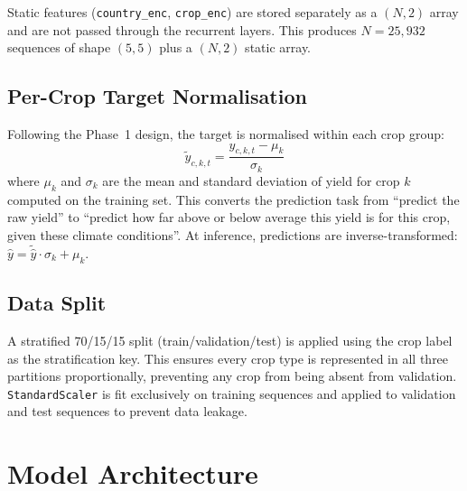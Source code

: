 \documentclass[conference]{IEEEtran}
\begin{document}
Static features (\texttt{country\_enc}, \texttt{crop\_enc}) are stored separately
as a $(N, 2)$ array and are not passed through the recurrent layers.
This produces $N = 25{,}932$ sequences of shape $(5, 5)$ plus a $(N, 2)$ static array.

\subsection{Per-Crop Target Normalisation}
\label{sec:normalisation}

Following the Phase~1 design, the target is normalised within each crop group:
\begin{equation}
    \tilde{y}_{c,k,t} = \frac{y_{c,k,t} - \mu_k}{\sigma_k}
\end{equation}
where $\mu_k$ and $\sigma_k$ are the mean and standard deviation of yield for
crop $k$ computed on the training set.
This converts the prediction task from ``predict the raw yield'' to
``predict how far above or below average this yield is for this crop,
given these climate conditions''.
At inference, predictions are inverse-transformed:
$\hat{y} = \tilde{\hat{y}} \cdot \sigma_k + \mu_k$.

\subsection{Data Split}
\label{sec:split}

A stratified 70/15/15 split (train/validation/test) is applied using the crop label
as the stratification key.
This ensures every crop type is represented in all three partitions proportionally,
preventing any crop from being absent from validation.
\texttt{StandardScaler} is fit exclusively on training sequences and applied to
validation and test sequences to prevent data leakage.

\section{Model Architecture}
\label{sec:arch}
\end{document}
